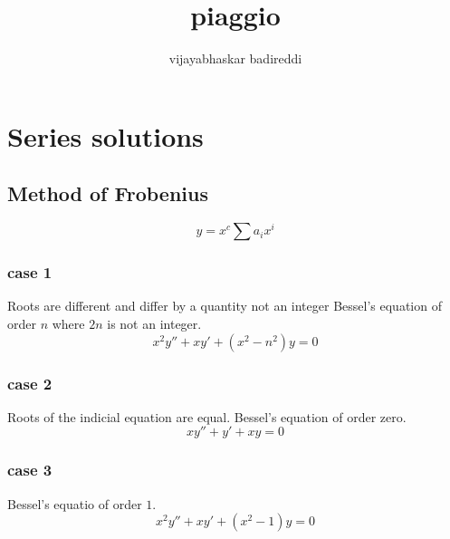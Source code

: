 \documentclass[12pt]{article}
\title{piaggio}
\author{vijayabhaskar badireddi}
\begin{document}
\section*{Series solutions}

\subsection*{Method of Frobenius}
\[y=x^c\sum a_ix^i\]
\subsubsection*{case 1}
Roots are different and differ by a quantity not an integer
Bessel's equation of order $n$ where $2n$ is not an integer.
\[x^2y''+xy'+(x^2-n^2)y=0\]
\subsubsection*{case 2}
Roots of the indicial equation are equal.
Bessel's equation of order zero.
\[xy''+y'+xy=0\]
\subsubsection*{case 3}
Bessel's equatio of order $1$.
\[x^2y''+xy'+(x^2-1)y=0\]
\end{document}
